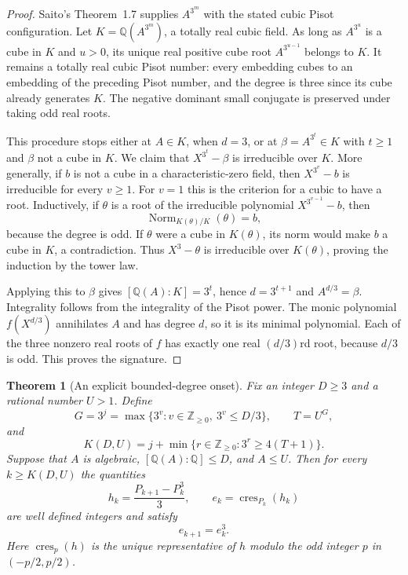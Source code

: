 \documentclass[11pt,a4paper]{article}
\newtheorem{theorem}{Theorem}[section]
\theoremstyle{definition}
\theoremstyle{remark}
\numberwithin{equation}{section}
\begin{document}
\begin{proof}
Saito's Theorem~1.7 supplies $A^{3^m}$ with the stated cubic Pisot
configuration. Let $K=\mathbb Q(A^{3^m})$, a totally real cubic field.
As long as $A^{3^u}$ is a cube in $K$ and $u>0$, its unique real
positive cube root $A^{3^{u-1}}$ belongs to $K$. It remains a totally
real cubic Pisot number: every embedding cubes to an embedding of
the preceding Pisot number, and the degree is three since its cube
already generates $K$. The negative dominant small conjugate is
preserved under taking odd real roots.

This procedure stops either at $A\in K$, when $d=3$, or at
$\beta=A^{3^t}\in K$ with $t\geq1$ and $\beta$ not a cube in $K$.
We claim that $X^{3^t}-\beta$ is irreducible over $K$. More generally,
if $b$ is not a cube in a characteristic-zero field, then
$X^{3^v}-b$ is irreducible for every $v\geq1$. For $v=1$ this is the
criterion for a cubic to have a root. Inductively, if $\theta$ is a
root of the irreducible polynomial $X^{3^{v-1}}-b$, then
\[
 \operatorname{Norm}_{K(\theta)/K}(\theta)=b,
\]
because the degree is odd. If $\theta$ were a cube in $K(\theta)$,
its norm would make $b$ a cube in $K$, a contradiction. Thus
$X^3-\theta$ is irreducible over $K(\theta)$, proving the induction
by the tower law.

Applying this to $\beta$ gives $[\mathbb Q(A):K]=3^t$, hence
$d=3^{t+1}$ and $A^{d/3}=\beta$. Integrality follows from the
integrality of the Pisot power. The monic polynomial $f(X^{d/3})$
annihilates $A$ and has degree $d$, so it is its minimal polynomial.
Each of the three nonzero real roots of $f$ has exactly one real
$(d/3)$rd root, because $d/3$ is odd. This proves the signature.
\end{proof}

\begin{theorem}[An explicit bounded-degree onset]\label{mil:thm:bounded-degree-onset}
Fix an integer $D\geq3$ and a rational number $U>1$. Define
\[
 G=3^j=\max\{3^v:v\in\mathbb Z_{\geq0},\ 3^v\leq D/3\},
 \qquad T=U^G,
\]
and
\[
 K(D,U)=j+\min\{r\in\mathbb Z_{\geq0}:3^r\geq4(T+1)\}.
\]
Suppose that $A$ is algebraic, $[\mathbb Q(A):\mathbb Q]\leq D$,
and $A\leq U$. Then for every $k\geq K(D,U)$ the quantities
\[
 h_k=\frac{P_{k+1}-P_k^3}{3},\qquad
 e_k=\operatorname{cres}_{P_k}(h_k)
\]
are well defined integers and satisfy
\[
 \boxed{e_{k+1}=e_k^3.}
\]
Here $\operatorname{cres}_{p}(h)$ is the unique representative of $h$
modulo the odd integer $p$ in $(-p/2,p/2)$.
\end{theorem}
\end{document}
